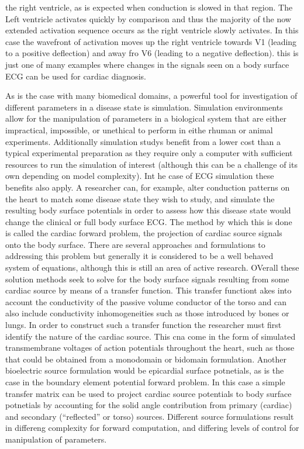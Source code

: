 \documentclass[12pt]{article}
\begin{document}
the right ventricle, as is expected when conduction is slowed in that region. The Left ventricle activates quickly by comparison and thus the majority of the now extended activation sequence occurs as the right ventricle slowly activates. In this case the wavefront of activation moves up the right ventricle towards V1 (leading to a positive deflection) and away fro V6 (leading to a negative deflection). this is just one of many examples where changes in the signals seen on a body surface ECG can be used for cardiac diagnosis. 

As is the case with many biomedical domains, a powerful tool for investigation of different parameters in a disease state is simulation. Simulation environments allow for the manipulation of parameters in a biological system that are either impractical, impossible, or unethical to perform in eithe rhuman or animal experiments. Additionally simulation studys benefit from a lower cost than a typical experimental preparation as they require only a computer with sufficient resources to run the simulation of interest (although this can be a challenge of its own depending on model complexity). Int he case of ECG simulation these benefits also apply. A researcher can, for example, alter conduction patterns on the heart to match some disease state they wish to study, and simulate the resulting body surface potentials in order to assess how this disease state would change the clinical or full body surface ECG. The method by which this is done is called the cardiac forward problem, the projection of cardiac source signals onto the body surface. There are several approaches and formulations to addressing this problem but generally it is considered to be a well behaved system of equations, although this is still an area of active research. OVerall these solution methods seek to solve for the body surface signals resulting from some cardiac source by means of a transfer function. This transfer functiont akes into account the conductivity of the passive volume conductor of the torso and can also include conductivity inhomogeneities such as those introduced by bones or lungs. In order to construct such a transfer function the researcher must first identify the nature of the cardiac source. This cna come in the form of simulated transmembrane voltages of action potentials throughout the heart, such as those that could be obtained from a monodomain or bidomain formulation. Another bioelectric source formulation would be epicardial surface potnetials, as is the case in the boundary element potential forward problem. In this case a simple transfer matrix can be used to project cardiac source potentials to body surface potnetials by accounting for the solid angle contribution from primary (cardiac) and secondary (``reflected'' or torso) sources. Different source formulations result in differeng complexity for forward computation, and differing levels of control for manipulation of parameters.
\end{document}
